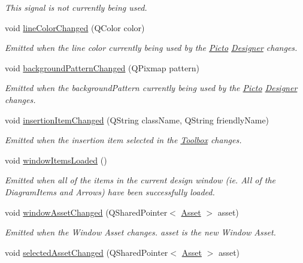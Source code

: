 \begin{DoxyCompactItemize}
\begin{DoxyCompactList}\small\item\em This signal is not currently being used. \end{DoxyCompactList}\item 
void \hyperlink{class_editor_state_a1771872fe0adcdf98d209fa3788cc486}{line\-Color\-Changed} (Q\-Color color)
\begin{DoxyCompactList}\small\item\em Emitted when the line color currently being used by the \hyperlink{namespace_picto}{Picto} \hyperlink{class_designer}{Designer} changes. \end{DoxyCompactList}\item 
void \hyperlink{class_editor_state_aff5503b5e634c74bee849b2b9f48ff79}{background\-Pattern\-Changed} (Q\-Pixmap pattern)
\begin{DoxyCompactList}\small\item\em Emitted when the background\-Pattern currently being used by the \hyperlink{namespace_picto}{Picto} \hyperlink{class_designer}{Designer} changes. \end{DoxyCompactList}\item 
void \hyperlink{class_editor_state_a9649a61472cb32012334d945339ca11f}{insertion\-Item\-Changed} (Q\-String class\-Name, Q\-String friendly\-Name)
\begin{DoxyCompactList}\small\item\em Emitted when the insertion item selected in the \hyperlink{class_toolbox}{Toolbox} changes. \end{DoxyCompactList}\item 
void \hyperlink{class_editor_state_ac20a26572d858576503acda7d7c7231f}{window\-Items\-Loaded} ()
\begin{DoxyCompactList}\small\item\em Emitted when all of the items in the current design window (ie. All of the Diagram\-Items and Arrows) have been successfully loaded. \end{DoxyCompactList}\item 
void \hyperlink{class_editor_state_a8ab4806896be67c7b57ae53f9f02147a}{window\-Asset\-Changed} (Q\-Shared\-Pointer$<$ \hyperlink{class_picto_1_1_asset}{Asset} $>$ asset)
\begin{DoxyCompactList}\small\item\em Emitted when the Window Asset changes. asset is the new Window Asset. \end{DoxyCompactList}\item 
\hypertarget{class_editor_state_acb38bf1c35a2cfd18857f932c211acc9}{void \hyperlink{class_editor_state_acb38bf1c35a2cfd18857f932c211acc9}{selected\-Asset\-Changed} (Q\-Shared\-Pointer$<$ \hyperlink{class_picto_1_1_asset}{Asset} $>$ asset)}\label{class_editor_state_acb38bf1c35a2cfd18857f932c211acc9}


\end{DoxyCompactItemize}
